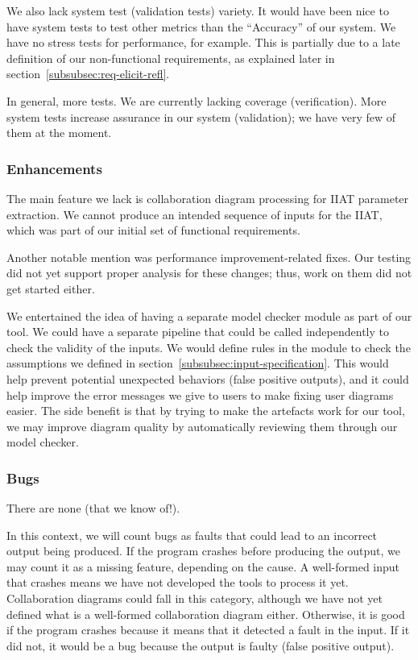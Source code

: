 We also lack system test (validation tests) variety.
It would have been nice to have system tests to test other metrics than the ``Accuracy'' of our system.
We have no stress tests for performance, for example.
This is partially due to a late definition of our non-functional requirements,
as explained later in section~\ref{subsubsec:req-elicit-refl}.

In general, more tests.
We are currently lacking coverage (verification).
More system tests increase assurance in our system (validation); we have very few of them at the moment.

\subsubsection{Enhancements}
The main feature we lack is collaboration diagram processing for IIAT parameter extraction.
We cannot produce an intended sequence of inputs for the IIAT, which was part of our initial set of functional requirements.

Another notable mention was performance improvement-related fixes.
Our testing did not yet support proper analysis for these changes; thus, work on them did not get started either.

We entertained the idea of having a separate model checker module as part of our tool.
We could have a separate pipeline that could be called independently to check the validity of the inputs.
We would define rules in the module to check the assumptions we defined in section~\ref{subsubsec:input-specification}.
This would help prevent potential unexpected behaviors (false positive outputs),
and it could help improve the error messages we give to users to make fixing user diagrams easier.
The side benefit is that by trying to make the artefacts work for our tool,
we may improve diagram quality by automatically reviewing them through our model checker.

\subsubsection{Bugs}
There are none (that we know of!).

In this context, we will count bugs as faults that could lead to an incorrect output being produced.
If the program crashes before producing the output, we may count it as a missing feature, depending on the cause.
A well-formed input that crashes means we have not developed the tools to process it yet.
Collaboration diagrams could fall in this category, although we have not yet defined what is a well-formed collaboration diagram either.
Otherwise, it is good if the program crashes because it means that it detected a fault in the input.
If it did not, it would be a bug because the output is faulty (false positive output).

